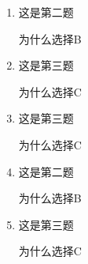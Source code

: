 \documentclass{sxtzh}
\begin{document}
\begin{enumerate}[resume]
    \item 这是第二题
    \begin{solution}
        为什么选择B
    \end{solution}
    \item 这是第三题
    \begin{solution}
        为什么选择C
    \end{solution}
    \item 这是第三题
    \begin{solution}
        为什么选择C
    \end{solution}
    \item 这是第二题
    \begin{solution}
        为什么选择B
    \end{solution}
    \item 这是第三题
    \begin{solution}
        为什么选择C
    \end{solution}
\end{enumerate}
\end{document}
